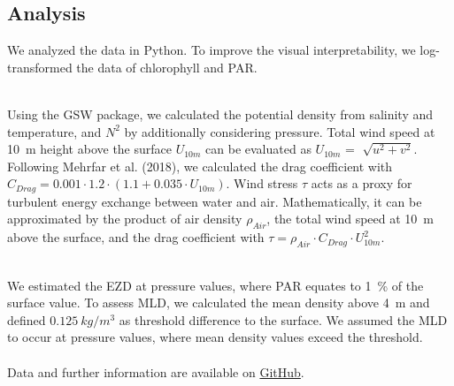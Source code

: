 \documentclass[../Main.tex]{subfiles}
\begin{document}
\subsection*{\crule[blue]{.2cm}{.2cm} Analysis}
We analyzed the data in Python.
To improve the visual interpretability, we log-transformed the data of chlorophyll and PAR.

\\
Using the GSW package, we calculated the potential density from salinity and temperature, and $N^2$ by additionally considering pressure\supercite{gsw}. 
Total wind speed at \SI{10}{m} height above the surface $U_{10m}$ can be evaluated as $U_{10m}$ = $\sqrt[]{u^2 + v^2}$. 
Following Mehrfar et al. (2018), we calculated the drag coefficient with $C_{Drag} = 0.001\cdot1.2\cdot  (1.1+0.035\cdot U_{10m})$. 
Wind stress $\tau$ acts as a proxy for turbulent energy exchange between water and air.
Mathematically, it can be approximated by the product of air density $\rho_{Air}$, the total wind speed at \SI{10}{m} above the surface, and the drag coefficient with $\tau = \rho_{Air}\cdot C_{Drag}\cdot U_{10m}^2$\supercite{Mehrfar2018}.

\\
We estimated the EZD at pressure values, where PAR equates to \SI{1}{\%} of the surface value\supercite{Lee2007}.
To assess MLD, we calculated the mean density above \SI{4}{m} and defined $\SI{0.125}{kg/m^3}$ as threshold difference to the surface. 
We assumed the MLD to occur at pressure values, where mean density values exceed the threshold. 
\\
\\
Data and further information are available on \href{https://github.com/joaldi2208/BloomDynamics}{GitHub}.
\end{document}
